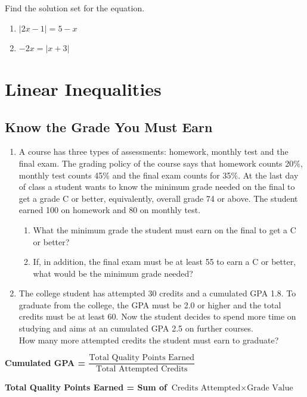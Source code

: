 \documentclass[
  en,11pt]{elegantbook}
\providecommand{\tightlist}{%
  \setlength{\itemsep}{0pt}\setlength{\parskip}{0pt}}
\newcommand{\size}[2]{{\fontsize{#1}{0}\selectfont#2}}
\newenvironment{rmdthink}{
	\vspace*{0.5\baselineskip}
	\par\noindent
	\makebox[-4pt][r]{\color{green!90}\size{12}{\faLightbulbO}\,\,}
    \begin{tcolorbox}[
    enhanced,
    title={\textbf{\color{second}Think}},
    title style={left color=blue!10!green!20!white,right color=yellow!20!blue!20!white},
    colback=green!20!white,
    ]
    \sffamily
}{
    \end{tcolorbox}
	\par\ignorespacesafterend
}
\let\BeginKnitrBlock\begin \let\EndKnitrBlock\end
\begin{document}
\BeginKnitrBlock{exercise}
\protect\hypertarget{exr:unnamed-chunk-191}{}{\label{exr:unnamed-chunk-191} }
Find the solution set for the equation.

\begin{enumerate}
\def\labelenumi{\arabic{enumi}.}

\item
  \(|2x-1|=5-x\)
\item
  \(-2x=|x+3|\)
\end{enumerate}
\EndKnitrBlock{exercise}

\hypertarget{linear-inequalities}{%
\chapter{Linear Inequalities}\label{linear-inequalities}}

\hypertarget{know-the-grade-you-must-earn}{%
\section{Know the Grade You Must Earn}\label{know-the-grade-you-must-earn}}

\begin{rmdthink}

\begin{enumerate}
\def\labelenumi{\arabic{enumi}.}

\item
  A course has three types of assessments: homework, monthly test and the final exam. The grading policy of the course says that homework counts 20\%, monthly test counts 45\% and the final exam counts for 35\%. At the last day of class a student wants to know the minimum grade needed on the final to get a grade C or better, equivalently, overall grade 74 or above. The student earned 100 on homework and 80 on monthly test.

  \begin{enumerate}
  \def\labelenumii{\arabic{enumii}.}
  \tightlist
  \item
    What the minimum grade the student must earn on the final to get a C or better?
  \item
    If, in addition, the final exam must be at least 55 to earn a C or better, what would be the minimum grade needed?
  \end{enumerate}
\item
  The college student has attempted 30 credits and a cumulated GPA 1.8. To graduate from the college, the GPA must be 2.0 or higher and the total credits must be at least 60. Now the student decides to spend more time on studying and aims at an cumulated GPA 2.5 on further courses.\\
  How many more attempted credits the student must earn to graduate?
\end{enumerate}

\textbf{Cumulated GPA = \(\dfrac{\text{Total Quality Points Earned}}{\text{Total Attempted Credits}}\)}

\textbf{Total Quality Points Earned = Sum of \(\text{Credits Attempted}\times \text{Grade Value}\)}

\end{rmdthink}
\end{document}
